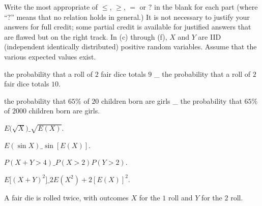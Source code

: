 \begin{problem}
  Write the most appropriate of \(\leq\), \(\geq\), \(=\) or \(?\) in the
  blank for each part (where ``\(?\)'' means that no relation holds in
  general.)  It is not necessary to justify your answers for full credit;
  some partial credit is available for justified answers that are flawed
  but on the right track.  In (c) through (f), \(X\) and \(Y\) are IID
  (independent identically distributed) positive random variables. Assume
  that the various expected values exist.
  \begin{alphlist}
  \item the probability that a roll of \(2\) fair dice totals \(9\) \_ the
    probability that a roll of \(2\) fair dice totals \(10\).
  \item the probability that \(65\%\) of \(20\) children born are girls \_
    the probability that \(65\%\) of \(2000\) children born are girls.
  \item \(E\bigl(\sqrt{X}\bigr)\_\sqrt{E(X)}\).
  \item \(E(\sin X)\_\sin[E(X)]\).
  \item \(P(X+Y>4)\_ P(X>2)P(Y>2)\).
  \item \(E\bigl[ (X+Y)^2 \bigr]\_ 2E(X^2)+2[E(X)]^2\).
  \end{alphlist}
\end{problem}
\begin{solution*}
\end{solution*}

\begin{problem}
  A fair die is rolled twice, with outcomes \(X\) for the \(1\)
  roll and \(Y\) for the \(2\) roll.
  \begin{alphlist}
  \item
  \end{alphlist}
\end{problem}
\begin{solution*}
\end{solution*}

\begin{problem}
\end{problem}
\begin{solution*}
\end{solution*}

\begin{problem}
\end{problem}
\begin{solution*}
\end{solution*}

